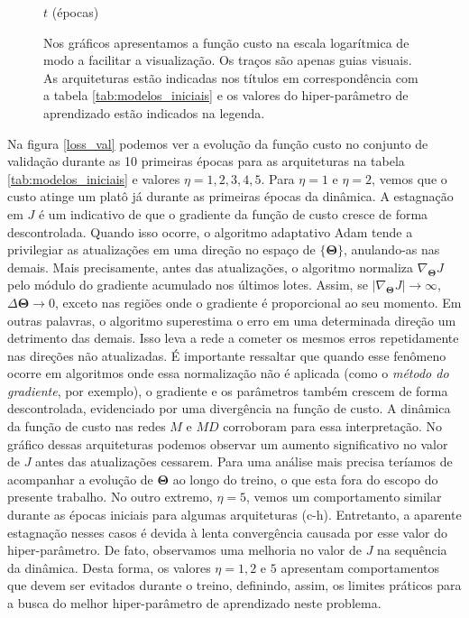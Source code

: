 \begin{figure}[!p]
\begin{center}
\begin{subfigure}{.5\textwidth}
		\end{subfigure}\hfill%
		\newline
		$t$ (épocas)
	\end{center}
	\small Nos gráficos apresentamos a função custo na escala logarítmica de modo a facilitar a visualização. Os traços são apenas guias visuais. As arquiteturas estão indicadas nos títulos em correspondência com a tabela \ref{tab:modelos_iniciais} e os valores do hiper-parâmetro de aprendizado estão indicados na legenda.
\end{figure}

Na figura \ref{loss_val} podemos ver a evolução da função custo no conjunto de validação durante as 10 primeiras épocas para as arquiteturas na tabela \ref{tab:modelos_iniciais} e valores $\eta=1,2,3,4,5$. Para $\eta=1$ e $\eta=2$, vemos que o custo atinge um platô já durante as primeiras épocas da dinâmica. A estagnação em $J$ é um indicativo de que o gradiente da função de custo cresce de forma descontrolada. Quando isso ocorre, o algoritmo adaptativo Adam tende a privilegiar as atualizações em uma direção no espaço de $\{\mathbf{\Theta}\}$, anulando-as nas demais. Mais precisamente, antes das atualizações, o algoritmo normaliza $\nabla_{\mathbf{\Theta}} J$ pelo módulo do gradiente acumulado nos últimos lotes. Assim, se $|\nabla_{\mathbf{\Theta}} J| \rightarrow \infty$, $\Delta \mathbf{\Theta} \rightarrow 0$, exceto nas regiões onde o gradiente é proporcional ao seu momento. Em outras palavras, o algoritmo superestima o erro em uma determinada direção um detrimento das demais. Isso leva a rede a cometer os mesmos erros repetidamente nas direções não atualizadas. É importante ressaltar que quando esse fenômeno ocorre em algoritmos onde essa normalização não é aplicada (como o \textit{método do gradiente}, por exemplo), o gradiente e os parâmetros também crescem de forma descontrolada, evidenciado por uma divergência na função de custo. A dinâmica da função de custo nas redes $M$ e $MD$ corroboram para essa interpretação. No gráfico dessas arquiteturas podemos observar um aumento significativo no valor de $J$ antes das atualizações cessarem. Para uma análise mais precisa teríamos de acompanhar a evolução de $\mathbf{\Theta}$ ao longo do treino, o que esta fora do escopo do presente trabalho. No outro extremo, $\eta=5$, vemos um comportamento similar durante as épocas iniciais para algumas arquiteturas (c-h). Entretanto, a aparente estagnação nesses casos é devida à lenta convergência causada por esse valor do hiper-parâmetro. De fato, observamos uma melhoria no valor de $J$ na sequência da dinâmica. Desta forma, 
os valores $\eta=1, 2$ e $5$ apresentam comportamentos que devem ser evitados durante o treino, definindo, assim, os limites práticos para a busca do melhor hiper-parâmetro de aprendizado neste problema.

